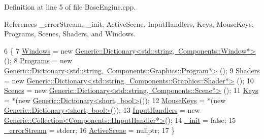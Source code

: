 Definition at line 5 of file Base\+Engine.\+cpp.



References \+\_\+error\+Stream, \+\_\+init, Active\+Scene, Input\+Handlers, Keys, Mouse\+Keys, Programs, Scenes, Shaders, and Windows.


\begin{DoxyCode}
6 \{
7     \mbox{\hyperlink{classEngine_1_1BaseEngine_a4a1a4c4dae052e66ecc4f326eeed4d33}{Windows}} = \textcolor{keyword}{new} \mbox{\hyperlink{classGeneric_1_1Dictionary}{Generic::Dictionary<std::string, Components::Window*>}}
      ();
8     \mbox{\hyperlink{classEngine_1_1BaseEngine_ae0f86360ea3a384caefe443dd8f88601}{Programs}} = \textcolor{keyword}{new} 
      \mbox{\hyperlink{classGeneric_1_1Dictionary}{Generic::Dictionary<std::string, Components::Graphics::Program*>}}
      ();
9     \mbox{\hyperlink{classEngine_1_1BaseEngine_a2582dee3f73da82bb422b43317b85e3b}{Shaders}} = \textcolor{keyword}{new} 
      \mbox{\hyperlink{classGeneric_1_1Dictionary}{Generic::Dictionary<std::string, Components::Graphics::Shader*>}}
      ();
10     \mbox{\hyperlink{classEngine_1_1BaseEngine_afd02af3c2fbe9bb734db014dec06585a}{Scenes}} = \textcolor{keyword}{new} \mbox{\hyperlink{classGeneric_1_1Dictionary}{Generic::Dictionary<std::string, Components::Scene*>}}
      ();
11     \mbox{\hyperlink{classEngine_1_1BaseEngine_a65321a97e83f0a6ee90df3efac2d3307}{Keys}} = *(\textcolor{keyword}{new} \mbox{\hyperlink{classGeneric_1_1Dictionary}{Generic::Dictionary<short, bool>}}());
12     \mbox{\hyperlink{classEngine_1_1BaseEngine_a3ee2bdddb66d45b8c808ffd937ba9c50}{MouseKeys}} = *(\textcolor{keyword}{new} \mbox{\hyperlink{classGeneric_1_1Dictionary}{Generic::Dictionary<short, bool>}}());
13     \mbox{\hyperlink{classEngine_1_1BaseEngine_a134fa082c5a64d62b76ddf926647e7cc}{InputHandlers}} = \textcolor{keyword}{new} 
      \mbox{\hyperlink{classGeneric_1_1Collection}{Generic::Collection<Components::IInputHandler*>}}();
14     \mbox{\hyperlink{classEngine_1_1BaseEngine_a79e265845b321c0e9822fb170c564e55}{\_init}} = \textcolor{keyword}{false};
15     \mbox{\hyperlink{classEngine_1_1BaseEngine_a26fd54a1ee2733f9c654af5afcfa96cf}{\_errorStream}} = stderr;
16     \mbox{\hyperlink{classEngine_1_1BaseEngine_adb3dbc839da9d821e08b18d8a221698d}{ActiveScene}} = \textcolor{keyword}{nullptr};
17 \}
\end{DoxyCode}
\mbox{\label{classEngine_1_1BaseEngine_a8a3ba672021058958d66af5ee432beac}} 

